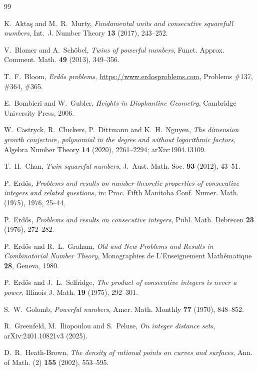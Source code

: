 \documentclass[11pt,reqno]{amsart}
\theoremstyle{definition}
\theoremstyle{remark}
\numberwithin{equation}{section}
\begin{document}
\clearpage
\begin{thebibliography}{99}

 K.~Akta\c{s} and M.~R.~Murty, \emph{Fundamental units and
consecutive squarefull numbers}, Int.~J. Number Theory \textbf{13} (2017),
243--252.

 V.~Blomer and A.~Sch\"obel, \emph{Twins of powerful
numbers}, Funct. Approx. Comment. Math. \textbf{49} (2013), 349--356.

 T.~F.~Bloom, \emph{Erd\H{o}s problems},
\url{https://www.erdosproblems.com}, Problems \#137, \#364, \#365.

 E.~Bombieri and W.~Gubler, \emph{Heights in
Diophantine Geometry}, Cambridge University Press, 2006.

 W.~Castryck, R.~Cluckers, P.~Dittmann and K.~H.~Nguyen,
\emph{The dimension growth conjecture, polynomial in the degree and without
logarithmic factors}, Algebra Number Theory \textbf{14} (2020), 2261--2294;
arXiv:1904.13109.

 T.~H.~Chan, \emph{Twin squareful numbers}, J.~Aust. Math.
Soc. \textbf{93} (2012), 43--51.

 P.~Erd\H{o}s, \emph{Problems and results on number
theoretic properties of consecutive integers and related questions}, in:
Proc. Fifth Manitoba Conf. Numer. Math. (1975), 1976, 25--44.

 P.~Erd\H{o}s, \emph{Problems and results on consecutive
integers}, Publ. Math. Debrecen \textbf{23} (1976), 272--282.

 P.~Erd\H{o}s and R.~L.~Graham, \emph{Old and New Problems
and Results in Combinatorial Number Theory}, Monographies de L'Enseignement
Mathématique \textbf{28}, Geneva, 1980.

 P.~Erd\H{o}s and J.~L.~Selfridge, \emph{The product of
consecutive integers is never a power}, Illinois J. Math. \textbf{19} (1975),
292--301.

 S.~W.~Golomb, \emph{Powerful numbers}, Amer. Math. Monthly
\textbf{77} (1970), 848--852.

 R.~Greenfeld, M.~Iliopoulou and S.~Peluse, \emph{On integer
distance sets}, arXiv:2401.10821v3 (2025).

 D.~R.~Heath-Brown, \emph{The density of rational points on
curves and surfaces}, Ann. of Math. (2) \textbf{155} (2002), 553--595.


\end{thebibliography}
\end{document}
